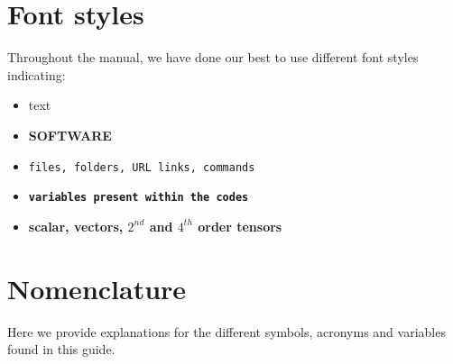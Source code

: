 \documentclass[a4paper,oneside,12pt]{book}
\title{\thesistitle}
\author{\authorname}
\newcommand{\fonts}[1]{\textbf{\texttt{#1}}}
\begin{document}


\newpage
\onehalfspacing%

\tableofcontents
\newpage
\section*{\Huge{Font styles}}
Throughout the manual, we have done our best to use different font styles indicating:
\begin{itemize}
    \item text
    \item \textbf{SOFTWARE} 
    \item \texttt{files, folders, URL links, commands}
    \item \fonts{variables present within the codes}
    \item \textbf{scalar, vectors, $2^{nd}$ and $4^{th}$ order tensors}
\end{itemize}

\newpage

\section*{\Huge{Nomenclature}}
Here we provide explanations for the different symbols, acronyms and variables found in this guide.
\end{document}
